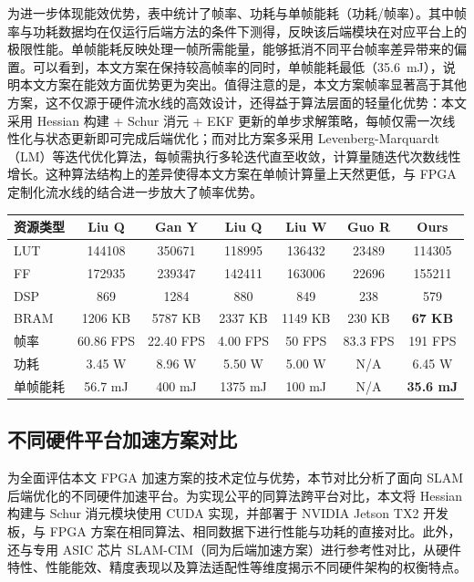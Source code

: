 为进一步体现能效优势，表中统计了帧率、功耗与单帧能耗（功耗/帧率）。其中帧率与功耗数据均在仅运行后端方法的条件下测得，反映该后端模块在对应平台上的极限性能。单帧能耗反映处理一帧所需能量，能够抵消不同平台帧率差异带来的偏置。可以看到，本文方案在保持较高帧率的同时，单帧能耗最低（35.6~mJ），说明本文方案在能效方面优势更为突出。值得注意的是，本文方案帧率显著高于其他方案，这不仅源于硬件流水线的高效设计，还得益于算法层面的轻量化优势：本文采用 Hessian 构建 + Schur 消元 + EKF 更新的单步求解策略，每帧仅需一次线性化与状态更新即可完成后端优化；而对比方案多采用 Levenberg-Marquardt（LM）等迭代优化算法，每帧需执行多轮迭代直至收敛，计算量随迭代次数线性增长。这种算法结构上的差异使得本文方案在单帧计算量上天然更低，与 FPGA 定制化流水线的结合进一步放大了帧率优势。

\begin{table}[!t]
\centering
{}
\label{tab:resource_comparison}
\begin{tabular}{lcccccc}
\toprule
资源类型 & Liu Q \cite{liu2022cicc} & Gan Y \cite{gan2021eudoxus} & Liu Q \cite{liu2020pi} & Liu W \cite{liu2021archytas} & Guo R \cite{guo2022fpga} & \textbf{Ours} \\
\midrule
LUT  & 144108 & 350671 & 118995 & 136432 & 23489  & 114305 \\
FF   & 172935 & 239347 & 142411 & 163006 & 22696  & 155211 \\
DSP  & 869    & 1284   & 880    & 849    & 238    & 579    \\
BRAM & 1206 KB & 5787 KB & 2337 KB & 1149 KB & 230 KB & \textbf{67 KB} \\
帧率  & 60.86 FPS & 22.40 FPS & 4.00 FPS & 50 FPS & 83.3 FPS & 191 FPS \\
功耗  & 3.45 W & 8.96 W & 5.50 W & 5.00 W & N/A & 6.45 W \\
单帧能耗  & 56.7 mJ & 400 mJ & 1375 mJ & 100 mJ & N/A & \textbf{35.6 mJ} \\
\bottomrule
\end{tabular}
\end{table}

\subsection{不同硬件平台加速方案对比}

为全面评估本文 FPGA 加速方案的技术定位与优势，本节对比分析了面向 SLAM 后端优化的不同硬件加速平台。为实现公平的同算法跨平台对比，本文将 Hessian 构建与 Schur 消元模块使用 CUDA 实现，并部署于 NVIDIA Jetson TX2 开发板，与 FPGA 方案在相同算法、相同数据下进行性能与功耗的直接对比。此外，还与专用 ASIC 芯片 SLAM-CIM\cite{Li2024SLAMCIM}（同为后端加速方案）进行参考性对比，从硬件特性、性能能效、精度表现以及算法适配性等维度揭示不同硬件架构的权衡特点。

